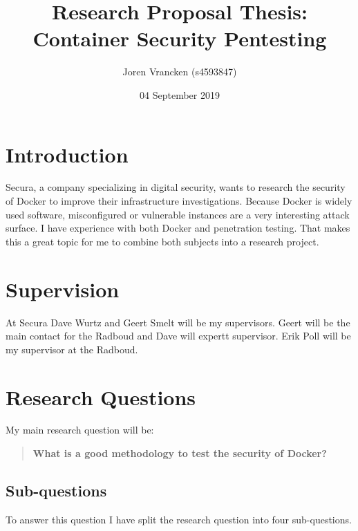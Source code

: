 \documentclass{article}
\title{Research Proposal Thesis:\\Container Security Pentesting}
\author{Joren Vrancken (s4593847)}
\date{04 September 2019}
\begin{document}
\maketitle

\section{Introduction}
Secura, a company specializing in digital security, wants to research the security of Docker to improve their infrastructure investigations. Because Docker is widely used software, misconfigured or vulnerable instances are a very interesting attack surface. I have experience with both Docker and penetration testing. That makes this a great topic for me to combine both subjects into a research project.

\section{Supervision}
At Secura Dave Wurtz and Geert Smelt will be my supervisors. Geert will be the main contact for the Radboud and Dave will expertt supervisor. Erik Poll will be my supervisor at the Radboud.

\section{Research Questions}
My main research question will be:
\begin{quote}
    \textbf{What is a good methodology to test the security of Docker?}
\end{quote}

\subsection{Sub-questions}
To answer this question I have split the research question into four sub-questions.
\end{document}
